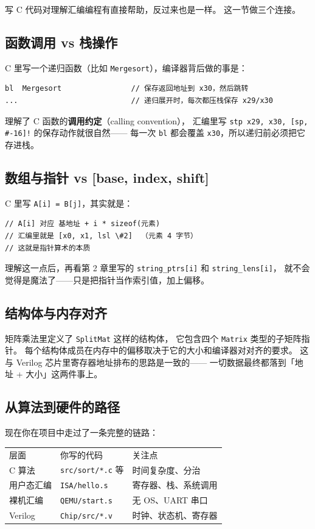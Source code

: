 写 C 代码对理解汇编编程有直接帮助，反过来也是一样。
这一节做三个连接。

\subsection{函数调用 vs 栈操作}

C 里写一个递归函数（比如 \texttt{Mergesort}），编译器背后做的事是：

\begin{lstlisting}[style=asm]
bl  Mergesort                // 保存返回地址到 x30，然后跳转
...                          // 递归展开时，每次都压栈保存 x29/x30
\end{lstlisting}

理解了 C 函数的\textbf{调用约定}（calling convention），
汇编里写 \texttt{stp x29, x30, [sp, \#-16]!} 的保存动作就很自然——
每一次 \texttt{bl} 都会覆盖 \texttt{x30}，所以递归前必须把它存进栈。

\subsection{数组与指针 vs [base, index, shift]}

C 里写 \texttt{A[i] = B[j]}，其实就是：
\begin{lstlisting}[style=asm]
// A[i] 对应 基地址 + i * sizeof(元素)
// 汇编里就是 [x0, x1, lsl \#2]  （元素 4 字节）
// 这就是指针算术的本质
\end{lstlisting}

理解这一点后，再看第 2 章里写的
\texttt{string\_ptrs[i]} 和 \texttt{string\_lens[i]}，
就不会觉得是魔法了——只是把指针当作索引值，加上偏移。

\subsection{结构体与内存对齐}

矩阵乘法里定义了 \texttt{SplitMat} 这样的结构体，
它包含四个 \texttt{Matrix} 类型的子矩阵指针。
每个结构体成员在内存中的偏移取决于它的大小和编译器对对齐的要求。
这与 Verilog 芯片里寄存器地址排布的思路是一致的——
一切数据最终都落到「地址 + 大小」这两件事上。

\subsection{从算法到硬件的路径}

现在你在项目中走过了一条完整的链路：

\begin{center}
\begin{tabular}{lll}
层面 & 你写的代码 & 关注点 \\
C 算法 & \texttt{src/sort/*.c} 等 & 时间复杂度、分治 \\
用户态汇编 & \texttt{ISA/hello.s} & 寄存器、栈、系统调用 \\
裸机汇编 & \texttt{QEMU/start.s} & 无 OS、UART 串口 \\
Verilog & \texttt{Chip/src/*.v} & 时钟、状态机、寄存器 \\
\end{tabular}
\end{center}

